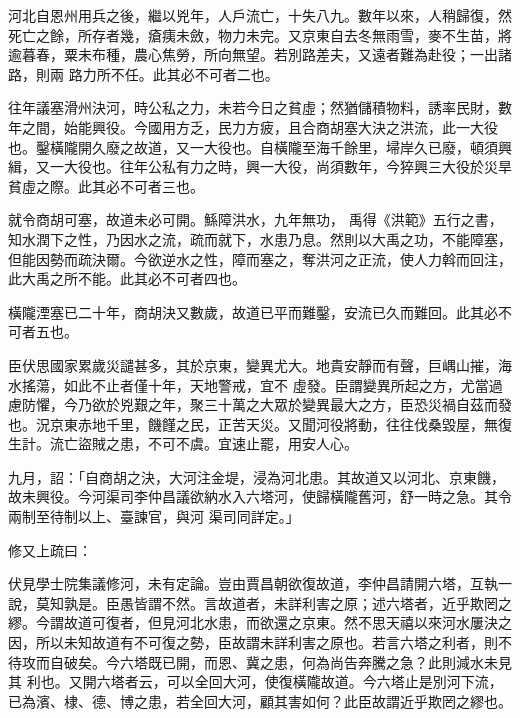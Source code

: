 \begin{pinyinscope}
 河北自恩州用兵之後，繼以兇年，人戶流亡，十失八九。數年以來，人稍歸復，然死亡之餘，所存者幾，瘡痍未斂，物力未完。又京東自去冬無雨雪，麥不生苗，將逾暮春，粟未布種，農心焦勞，所向無望。若別路差夫，又遠者難為赴役；一出諸路，則兩
 路力所不任。此其必不可者二也。



 往年議塞滑州決河，時公私之力，未若今日之貧虛；然猶儲積物料，誘率民財，數年之間，始能興役。今國用方乏，民力方疲，且合商胡塞大決之洪流，此一大役也。鑿橫隴開久廢之故道，又一大役也。自橫隴至海千餘里，埽岸久已廢，頓須興緝，又一大役也。往年公私有力之時，興一大役，尚須數年，今猝興三大役於災旱貧虛之際。此其必不可者三也。



 就令商胡可塞，故道未必可開。鯀障洪水，九年無功，
 禹得《洪範》五行之書，知水潤下之性，乃因水之流，疏而就下，水患乃息。然則以大禹之功，不能障塞，但能因勢而疏決爾。今欲逆水之性，障而塞之，奪洪河之正流，使人力斡而回注，此大禹之所不能。此其必不可者四也。



 橫隴湮塞已二十年，商胡決又數歲，故道已平而難鑿，安流已久而難回。此其必不可者五也。



 臣伏思國家累歲災譴甚多，其於京東，變異尤大。地貴安靜而有聲，巨嵎山摧，海水搖蕩，如此不止者僅十年，天地警戒，宜不
 虛發。臣謂變異所起之方，尤當過慮防懼，今乃欲於兇艱之年，聚三十萬之大眾於變異最大之方，臣恐災禍自茲而發也。況京東赤地千里，饑饉之民，正苦天災。又聞河役將動，往往伐桑毀屋，無復生計。流亡盜賊之患，不可不虞。宜速止罷，用安人心。



 九月，詔：「自商胡之決，大河注金堤，浸為河北患。其故道又以河北、京東饑，故未興役。今河渠司李仲昌議欲納水入六塔河，使歸橫隴舊河，舒一時之急。其令兩制至待制以上、臺諫官，與河
 渠司同詳定。」



 修又上疏曰：



 伏見學士院集議修河，未有定論。豈由賈昌朝欲復故道，李仲昌請開六塔，互執一說，莫知孰是。臣愚皆謂不然。言故道者，未詳利害之原；述六塔者，近乎欺罔之繆。今謂故道可復者，但見河北水患，而欲還之京東。然不思天禧以來河水屢決之因，所以未知故道有不可復之勢，臣故謂未詳利害之原也。若言六塔之利者，則不待攻而自破矣。今六塔既已開，而恩、冀之患，何為尚告奔騰之急？此則減水未見其
 利也。又開六塔者云，可以全回大河，使復橫隴故道。今六塔止是別河下流，已為濱、棣、德、博之患，若全回大河，顧其害如何？此臣故謂近乎欺罔之繆也。




\end{pinyinscope}
